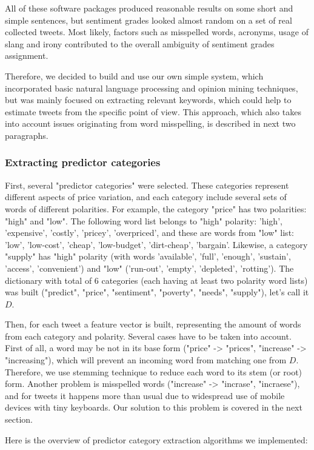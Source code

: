 All of these software packages produced reasonable results on some short and simple sentences, but sentiment grades looked almost random on a set of real collected tweets. Most likely, factors such as misspelled words, acronyms, usage of slang and irony contributed to the overall ambiguity of sentiment grades assignment.

Therefore, we decided to build and use our own simple system, which incorporated basic natural language processing and opinion mining techniques, but was mainly focused on extracting relevant keywords, which could help to estimate tweets from the specific point of view. This approach, which also takes into account issues originating from word misspelling, is described in next two paragraphs.

\subsubsection*{Extracting predictor categories}
First, several "predictor categories" were selected. These categories represent different aspects of price variation, and each category include several sets of words of different polarities. For example, the category "price" has two polarities: "high" and "low". The following word list belongs to "high" polarity: 'high', 'expensive', 'costly', 'pricey', 'overpriced', and these are words from "low" list: 'low', 'low-cost', 'cheap', 'low-budget', 'dirt-cheap', 'bargain'. Likewise, a category "supply" has "high" polarity (with words 'available', 'full', 'enough', 'sustain', 'access', 'convenient') and "low" ('run-out', 'empty', 'depleted', 'rotting'). The dictionary with total of 6 categories (each having at least two polarity word lists) was built ("predict", "price", "sentiment", "poverty", "needs", "supply"), let's call it $D$.

Then, for each tweet a feature vector is built, representing the amount of words from each category and polarity. Several cases have to be taken into account. First of all, a word may be not in its base form ("price" -> "prices", "increase" -> "increasing"), which will prevent an incoming word from matching one from $D$. Therefore, we use stemming technique to reduce each word to its stem (or root) form. Another problem is misspelled words ("increase" -> "incrase", "incraese"), and for tweets it happens more than usual due to widespread use of mobile devices with tiny keyboards. Our solution to this problem is covered in the next section.

Here is the overview of predictor category extraction algorithms we implemented:\\

